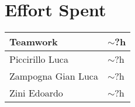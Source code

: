\section{Effort Spent}
\begin{tabular}{| p{5cm} | p{5cm} |}
\hline
Teamwork & $\sim$?h\\
\hline
Piccirillo Luca & $\sim$?h\\
\hline
Zampogna Gian Luca & $\sim$?h\\
\hline
Zini Edoardo & $\sim$?h\\
\hline
\end{tabular}
